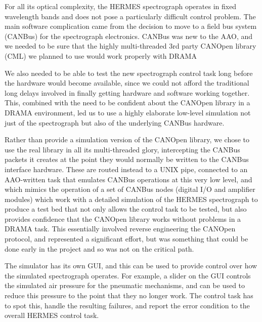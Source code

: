 For all its optical complexity, the HERMES spectrograph operates in fixed wavelength bands and does not pose a particularly difficult control problem. The main software complication came from the decision to move to a field bus system (CANBus) for the spectrograph electronics. CANBus was new to the AAO, and we needed to be sure that the highly multi-threaded 3rd party CANOpen library (CML) we planned to use would work properly with DRAMA

We also needed to be able to test the new spectrograph control task long before the hardware would become available, since we could not afford the traditional long delays involved in finally getting hardware and software working together. This, combined with the need to be confident about the CANOpen library in a DRAMA environment, led us to use a highly elaborate low-level simulation not just of the spectrograph but also of the underlying CANBus hardware.

Rather than provide a simulation version of the CANOpen library, we chose to use the real library in all its multi-threaded glory, intercepting the CANBus packets it creates at the point they would normally be written to the CANBus interface hardware. These are routed instead to a UNIX pipe, connected to an AAO-written task that emulates CANBus operations at this very low level, and which mimics the operation of a set of CANBus nodes (digital I/O and amplifier modules) which work with a detailed simulation of the HERMES spectrograph to produce a test bed that not only allows the control task to be tested, but also provides confidence that the CANOpen library works without problems in a DRAMA task. This essentially involved reverse engineering the CANOpen protocol, and represented a significant effort, but was something that could be done early in the project and so was not on the critical path.

The simulator has its own GUI, and this can be used to provide control over how the simulated spectrograph operates. For example, a slider on the GUI controls the simulated air pressure for the pneumatic mechanisms, and can be used to reduce this pressure to the point that they no longer work. The control task has to spot this, handle the resulting failures, and report the error condition to the overall HERMES control task.

